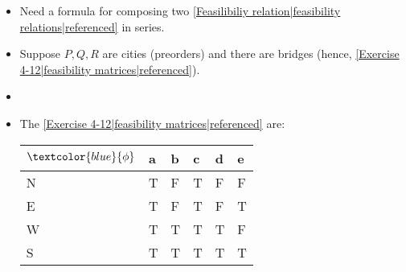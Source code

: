 
\begin{itemize}
    \item Need a formula for composing two \ref{Feasilibiliy relation|feasibility relations|referenced} in series.
    \item Suppose $P,Q,R$ are cities (preorders) and there are bridges (hence, \ref{Exercise 4-12|feasibility matrices|referenced}).
    \item


    \item The \ref{Exercise 4-12|feasibility matrices|referenced} are:

          \begin{minipage}{0.48\textwidth}

            \begin{tabular}{|l|l|l|l|l|l|}
              \hline
              $\textcolor{blue}{\phi}$ & a & b & c & d & e \\ \hline
              N                        & T & F & T & F & F \\ \hline
              E                        & T & F & T & F & T \\ \hline
              W                        & T & T & T & T & F \\ \hline
              S                        & T & T & T & T & T \\ \hline
            \end{tabular}
          \end{minipage}


\end{itemize}
